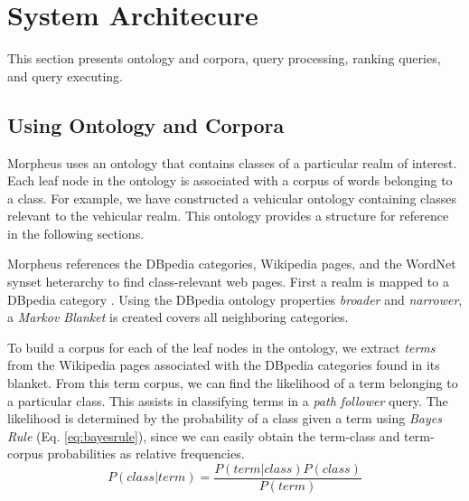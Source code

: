 \section{System Architecure}
\label{sec:systemarch}

This section presents ontology and corpora, query processing, ranking queries, and query executing.

\subsection{Using Ontology and Corpora} 
\label{sec:ontology_corpora}

Morpheus uses an ontology that contains classes of a particular realm of interest. Each leaf node in the ontology is associated with a corpus of words belonging to a class.  For example, we have constructed a vehicular ontology containing classes relevant to the vehicular realm. This ontology provides a structure for reference in the following sections.



Morpheus references the DBpedia categories, Wikipedia pages, and the WordNet synset heterarchy to find class-relevant web pages. First a realm is mapped to a DBpedia category \cite{Bizer2009}. Using the DBpedia ontology properties \emph{broader} and \emph{narrower}, a \emph{Markov Blanket} \cite{PRIS} is created covers all neighboring categories.


To build a corpus for each of the leaf nodes in the ontology, we extract \emph{terms} from the Wikipedia pages associated with the DBpedia categories found in its blanket. From this term corpus, we can find the likelihood of a term belonging to a particular class. This assists in classifying terms in a \emph{path follower} query. The likelihood is determined by the probability of a class given a term using \textit{Bayes Rule} (Eq. \ref{eq:bayesrule}), since we can easily obtain the term-class and term-corpus probabilities as relative frequencies. 
\begin{equation}
\label{eq:bayesrule}
P (class | term) = \frac{P(term | class) P(class)}{P(term)}
\end{equation}    

